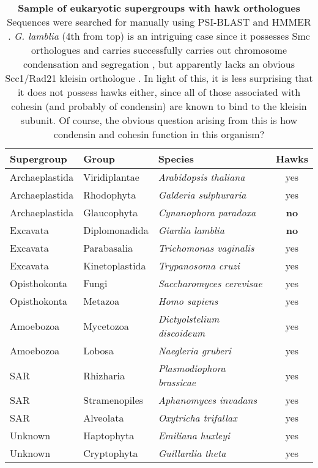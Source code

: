 \documentclass[a4paper,11pt,twoside,openright]{scrbook}
\begin{document}
\begin{table}[h]
    \captionsetup{width=0.85\linewidth}
    \caption[Sample of eukaryotic supergroups with hawk orthologues]{\sffamily
    \textbf{Sample of eukaryotic supergroups with hawk orthologues} \\ \small
    Sequences were searched for manually using PSI-BLAST and HMMER
    \cite{Altschul1997,Finn2011}. \textit{G. lamblia} (4th from top) is an
    intriguing case since it possesses Smc orthologues and carries successfully
    carries out chromosome condensation and segregation \cite{Tumova2015}, but
    apparently lacks an obvious Scc1/Rad21 kleisin orthologue
    \cite{Eme2011,Tumova2015}. In light of this, it is less surprising that it
    does not possess hawks either, since all of those associated with cohesin
    (and probably of condensin) are known to bind to the kleisin subunit. Of
    course, the obvious question arising from this is how condensin and cohesin
    function in this organism?}
    \centering
    \onehalfspacing
    \begin{tabular}{l l l c}
    \hline
    Supergroup  & Group   &  Species &   Hawks\\[0.1cm]
    \hline
Archaeplastida &   Viridiplantae  &   \textit{Arabidopsis thaliana}     &  yes\\
Archaeplastida &   Rhodophyta     &   \textit{Galderia sulphuraria}     &  yes\\
Archaeplastida &   Glaucophyta    &   \textit{Cynanophora paradoxa}     &
        \textbf{no}\\
Excavata       &   Diplomonadida  &   \textit{Giardia lamblia}          &
        \textbf{no}\\
Excavata       &   Parabasalia    &   \textit{Trichomonas vaginalis}    &  yes\\
Excavata       &   Kinetoplastida &   \textit{Trypanosoma cruzi}        &  yes\\
Opisthokonta   &   Fungi          &   \textit{Saccharomyces cerevisae}  &  yes\\
Opisthokonta   &   Metazoa        &   \textit{Homo sapiens}             &  yes\\
Amoebozoa      &   Mycetozoa      &   \textit{Dictyolstelium discoideum}&  yes\\
Amoebozoa      &   Lobosa         &   \textit{Naegleria gruberi}        &  yes\\
SAR            &   Rhizharia      &   \textit{Plasmodiophora brassicae} &  yes\\
SAR            &   Stramenopiles  &   \textit{Aphanomyces invadans}     &  yes\\
SAR            &   Alveolata      &   \textit{Oxytricha trifallax}      &  yes\\
Unknown        &   Haptophyta     &   \textit{Emiliana huxleyi}         &  yes\\
Unknown        &   Cryptophyta    &   \textit{Guillardia theta}         &  yes\\
[0.1cm]
    \hline
    \end{tabular}
    \label{table:eukaryotehawks}
\end{table}
\end{document}
